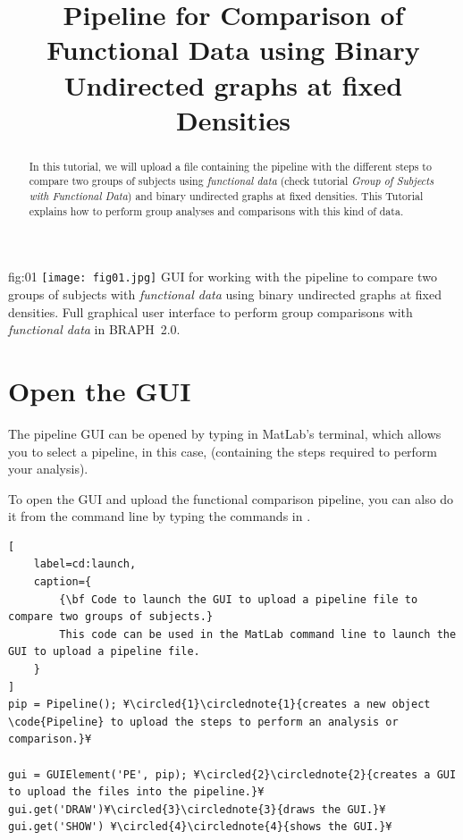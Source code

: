 \documentclass[justified]{tufte-handout}
\title{Pipeline for Comparison of Functional Data using Binary Undirected graphs at fixed Densities}
\begin{document}
\maketitle

\begin{abstract}
\noindent
In this tutorial, we will upload a file containing the pipeline with the different steps to compare two groups of subjects using \emph{functional data} (check tutorial \emph{Group of Subjects with Functional Data}) and binary undirected graphs at fixed densities. This Tutorial explains how to perform group analyses and comparisons with this kind of data.
\end{abstract}

\tableofcontents

	{fig:01}
	{\texttt{[image: fig01.jpg]}}
	{GUI for working with the pipeline to compare two groups of subjects with \emph{functional data} using binary undirected graphs at fixed densities.}
	{
	Full graphical user interface to perform group comparisons with \emph{functional data} in BRAPH~2.0. 
	}

\clearpage
\section{Open the GUI}

The pipeline GUI can be opened by typing  in MatLab's terminal, which allows you to select a pipeline, in this case,  (containing the steps required to perform your analysis).

To open the GUI and upload the functional comparison pipeline, you can also do it from the command line by typing the commands in .
%
\begin{lstlisting}[
	label=cd:launch,
	caption={
		{\bf Code to launch the GUI to upload a pipeline file to compare two groups of subjects.}
		This code can be used in the MatLab command line to launch the GUI to upload a pipeline file.
	}
]
pip = Pipeline(); ¥\circled{1}\circlednote{1}{creates a new object \code{Pipeline} to upload the steps to perform an analysis or comparison.}¥

gui = GUIElement('PE', pip); ¥\circled{2}\circlednote{2}{creates a GUI to upload the files into the pipeline.}¥
gui.get('DRAW')¥\circled{3}\circlednote{3}{draws the GUI.}¥
gui.get('SHOW') ¥\circled{4}\circlednote{4}{shows the GUI.}¥
\end{lstlisting}
\end{document}
